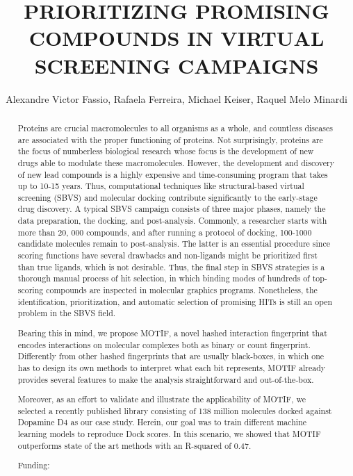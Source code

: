 \documentclass[twoside]{article}
\title{\vspace{-15mm}\fontsize{24pt}{10pt}\selectfont\textbf{ PRIORITIZING PROMISING COMPOUNDS IN VIRTUAL SCREENING CAMPAIGNS }} %
\author{ Alexandre Victor Fassio, Rafaela Ferreira, Michael Keiser, Raquel Melo Minardi }
\affil{ UFMG }
\date{}
\begin{document}
  
  
  \maketitle %
  
  
  \thispagestyle{fancy} %
  
  
  \begin{abstract}
  Proteins are crucial macromolecules to all organisms as a whole,  and countless
diseases are associated with the proper functioning of proteins. Not surprisingly,  proteins are the focus of numberless biological research whose focus is the development of new drugs able to modulate these macromolecules. However,  the development and discovery of new lead compounds is a highly expensive and time-consuming program that takes up to 10-15 years. Thus,  computational techniques like structural-based virtual screening (SBVS) and molecular docking contribute significantly to the early-stage drug discovery. A typical SBVS campaign consists of three major phases,  namely the data preparation,  the docking,  and post-analysis. Commonly,  a researcher starts with more than 20, 000 compounds,  and after running a protocol of docking,  100-1000 candidate molecules remain to post-analysis. The latter is an essential procedure since scoring functions have several drawbacks and non-ligands might be prioritized first than true ligands,  which is not desirable. Thus,  the final step in SBVS strategies is a thorough manual process of hit selection,  in which binding modes of hundreds of top-scoring compounds are inspected in molecular graphics programs. Nonetheless,  the identification,  prioritization,  and automatic selection of promising HITs is still an open problem in the SBVS field.

Bearing this in mind,  we propose MOTIF,  a novel hashed interaction fingerprint that encodes interactions on molecular complexes both as binary or count fingerprint. Differently from other hashed fingerprints that are usually black-boxes,  in which one has to design its own methods to interpret what each bit represents,   MOTIF already provides several features to make the analysis straightforward and out-of-the-box.

Moreover,  as an effort to validate and illustrate the applicability of MOTIF,  we selected a recently published library consisting of 138 million molecules docked against Dopamine D4 as our case study. Herein,  our goal was to train different machine learning models to reproduce Dock scores. In this scenario,  we showed that MOTIF outperforms state of the art methods with an R-squared of 0.47.
  
  Funding:  \\ 
  \end{abstract}
  
\end{document}
